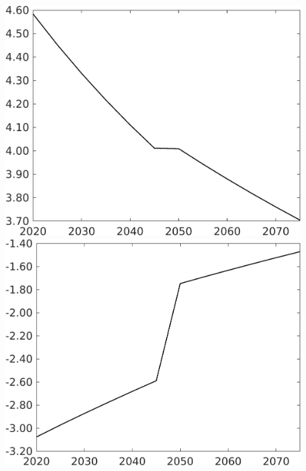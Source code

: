 \documentclass[12pt]{article}
\begin{document}
\begin{figure}[h!!]
\begin{minipage}[]{0.32\textwidth}
	\end{minipage}		
	\begin{minipage}[]{0.32\textwidth}
		\includegraphics[width=1\textwidth]{../../codding_model/own_basedOnFried/optimalPol_010922_revision/figures/all_13Sept22/CompTaufPER_bytaul_Reg0_sff_spillover0_nsk0_xgr0_knspil1_sep1_LFlimit1_emsbase0_countec0_GovRev0_etaa0.79_lgd0.png}
	\end{minipage}		
	\begin{minipage}[]{0.32\textwidth}
		\includegraphics[width=1\textwidth]{../../codding_model/own_basedOnFried/optimalPol_010922_revision/figures/all_13Sept22/CompTaufPER_bytaul_Reg0_sg_spillover0_nsk0_xgr0_knspil1_sep1_LFlimit1_emsbase0_countec0_GovRev0_etaa0.79_lgd0.png}

\end{minipage}
\end{figure}
\end{document}
